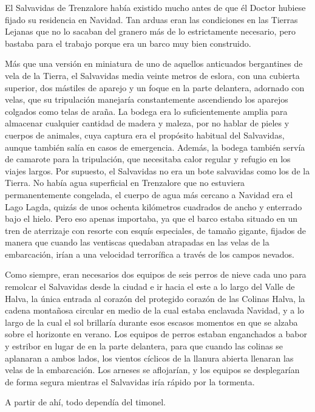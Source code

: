 El Salvavidas de Trenzalore había existido mucho antes de que él Doctor hubiese fijado su residencia en Navidad. Tan arduas eran las condiciones en las Tierras Lejanas que no lo sacaban del granero más de lo estrictamente necesario, pero bastaba para el trabajo porque era un barco muy bien construido.
 
Más que una versión en miniatura de uno de aquellos anticuados bergantines de vela de la Tierra, el Salvavidas media veinte metros de eslora, con una cubierta superior, dos mástiles de aparejo y un foque en la parte delantera, adornado con velas, que su tripulación manejaría constantemente ascendiendo los aparejos colgados como telas de araña. La bodega era lo suficientemente amplia para almacenar cualquier cantidad de madera y maleza, por no hablar de pieles y cuerpos de animales, cuya captura era el propósito habitual del Salvavidas, aunque también salía en casos de emergencia. Además, la bodega también servía de camarote para la tripulación, que necesitaba calor regular y refugio en los viajes largos. Por supuesto, el Salvavidas no era un bote salvavidas como los de la Tierra. No había agua superficial en Trenzalore que no estuviera permanentemente congelada, el cuerpo de agua más cercano a Navidad era el Lago Lagda, quizás de unos ochenta kilómetros cuadrados de ancho y enterrado bajo el hielo. Pero eso apenas importaba, ya que el barco estaba situado en un tren de aterrizaje con resorte con esquís especiales, de tamaño gigante, fijados de manera que cuando las ventiscas quedaban atrapadas en las velas de la embarcación, irían a una velocidad terrorífica a través de los campos nevados.
 
Como siempre, eran necesarios dos equipos de seis perros de nieve cada uno para remolcar el Salvavidas desde la ciudad e ir hacia el este a lo largo del Valle de Halva, la única entrada al corazón del protegido corazón de las Colinas Halva, la cadena montañosa circular en medio de la cual estaba enclavada Navidad, y a lo largo de la cual el sol brillaría durante esos escasos momentos en que se alzaba sobre el horizonte en verano. Los equipos de perros estaban enganchados a babor y estribor en lugar de en la parte delantera, para que cuando las colinas se aplanaran a ambos lados, los vientos cíclicos de la llanura abierta llenaran las velas de la embarcación. Los arneses se aflojarían, y los equipos se desplegarían de forma segura mientras el Salvavidas iría rápido por la tormenta.
 
A partir de ahí, todo dependía del timonel.
 

